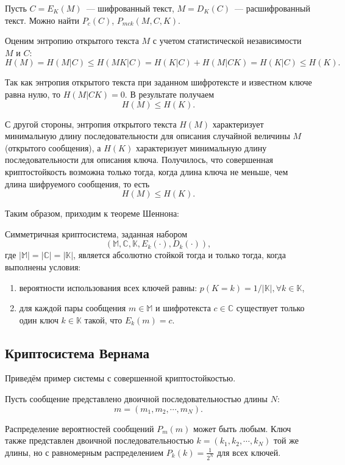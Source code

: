 Пусть $C = E_K(M)$~--- шифрованный текст, $M = D_K(C)$~--- расшифрованный текст. Можно найти $P_c(C)$, $P_{mck}(M, C, K).$

Оценим энтропию открытого текста $M$ с учетом статистической независимости $M$ и $C$:
$$H(M) = H(M|C) \leq H(MK|C) = H(K|C) + H(M|CK) = H(K|C) \leq H(K).$$

Так как энтропия открытого текста при заданном шифротексте и известном ключе равна нулю, то $H(M|CK) = 0$. В результате получаем
$$ H(M) \leq H(K). $$

С другой стороны, энтропия открытого текста $H(M)$ характеризует минимальную длину последовательности для описания случайной величины 
$M$ (открытого сообщения), а $H(K)$ характеризует минимальную длину последовательности для описания ключа. Получилось, что совершенная криптостойкость возможна 
только тогда, когда длина ключа не меньше, чем длина шифруемого сообщения, то есть
$$ H(M) \leq H(K). $$

Таким образом, приходим к теореме Шеннона:
\begin{theorem}
  Симметричная криптосистема, заданная набором $$ (\mathbb{M}, \mathbb{C}, \mathbb{K}, E_k(\cdot), D_k(\cdot)), $$
  где $|\mathbb{M}| = |\mathbb{C}| = |\mathbb{K}|$, является абсолютно стойкой тогда и только тогда, когда выполнены условия:
  \begin{enumerate}
    \item вероятности использования всех ключей равны: $p(K = k) = 1 / |\mathbb{K}|, \forall k \in \mathbb{K}$,
    \item для каждой пары сообщения $m \in \mathbb{M}$ и шифротекста $c \in \mathbb{C}$ существует только один ключ $k \in \mathbb{K}$ такой, что $E_k(m) = c$.
  \end{enumerate}
\end{theorem}


\subsection{Криптосистема Вернама}
Приведём пример системы с совершенной криптостойкостью.

Пусть сообщение представлено двоичной последовательностью длины $N$:
$$ m = (m_1, m_2, \cdots, m_N). $$

Распределение вероятностей сообщений $P_m(m)$ может быть любым. Ключ также представлен двоичной последовательностью $k =
(k_1, k_2, \cdots, k_N )$ той же длины, но с равномерным распределением $P_k(k) = \frac{1}{2^N}$
для всех ключей.

